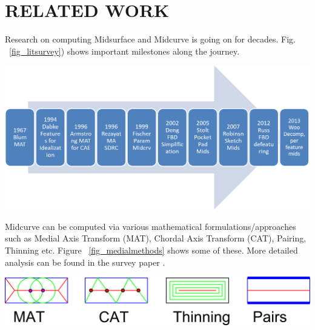 \documentclass[9pt,academicons]{article}
\begin{document}
\section{RELATED WORK}

Research on computing Midsurface and Midcurve is going on for decades. Fig. ~\ref{fig_litsurvey}) shows important milestones along the journey.

    \begin{center}
	\includegraphics[width=0.8\linewidth]{images/midcurve15}
	\label{fig_litsurvey}
    \end{center}
    

Midcurve can be computed via various mathematical formulations/approaches such as Medial Axis Transform (MAT), Chordal Axis Transform (CAT), Pairing, Thinning etc. Figure ~\ref{fig_medialmethods} shows some of these. More detailed analysis can be found in the survey paper \cite{medial2010}.

    \begin{center}
	\includegraphics[width=0.6\linewidth]{images/MedialMethodsOnlyShort}
	\label{fig_medialmethods}
    \end{center}
    
\end{document}
